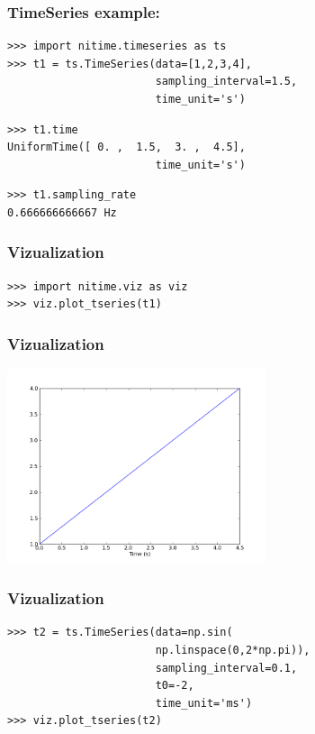 \documentclass{beamer}
\begin{document}
\begin{frame}[fragile]
\frametitle{TimeSeries example:}
\pause
\begin{lstlisting}
>>> import nitime.timeseries as ts 
>>> t1 = ts.TimeSeries(data=[1,2,3,4],
                       sampling_interval=1.5,
                       time_unit='s')
\end{lstlisting}

\pause
\begin{lstlisting}
>>> t1.time
UniformTime([ 0. ,  1.5,  3. ,  4.5], 
                       time_unit='s')
\end{lstlisting}

\pause
\begin{lstlisting}
>>> t1.sampling_rate
0.666666666667 Hz
\end{lstlisting}

\end{frame}

\begin{frame}[fragile]
\frametitle{Vizualization}
\pause
\begin{lstlisting}
>>> import nitime.viz as viz
>>> viz.plot_tseries(t1)
\end{lstlisting}
\end{frame}

\begin{frame}
\frametitle{Vizualization}
\includegraphics[height=5.7cm]{figures/simple_viz}
\end{frame}

\begin{frame}[fragile]
\frametitle{Vizualization}
\begin{lstlisting}
>>> t2 = ts.TimeSeries(data=np.sin(
                       np.linspace(0,2*np.pi)),
                       sampling_interval=0.1,
                       t0=-2, 
                       time_unit='ms')
>>> viz.plot_tseries(t2)
\end{lstlisting}
\end{frame}
\end{document}
